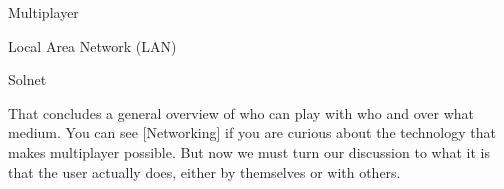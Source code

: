     \item Multiplayer
        \startitemize[4]
        \item Local Area Network (LAN)
        \item Solnet
        \stopitemize
\stopitemize

That concludes a general overview of who can play with who and over what medium. You can see [Networking] if you are curious about the technology that makes multiplayer possible. But now we must turn our discussion to what it is that the user actually does, either by themselves or with others.

